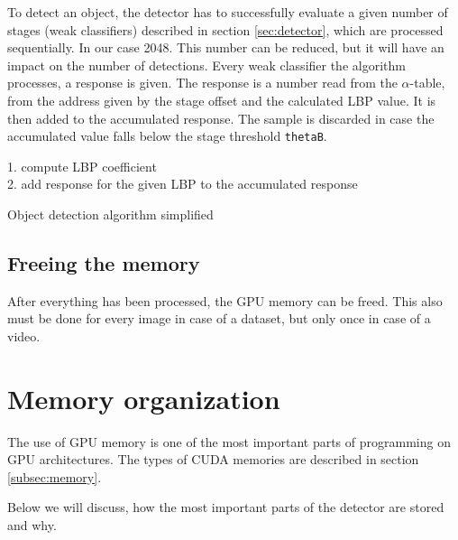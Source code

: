 To detect an object, the detector has to successfully evaluate a given number of stages (weak classifiers) described in section \ref{sec:detector}, which are processed sequentially. In our case 2048. This number can be reduced, but it will have an impact on the number of detections. Every weak classifier the algorithm processes, a response is given. The response is a number read from the $\alpha$-table, from the address given by the stage offset and the calculated LBP value. It is then added to the accumulated response. The sample is discarded in case the accumulated value falls below the stage threshold \verb|thetaB|.

\begin{algorithm} \label{alg:detection}
{
	{
		1. compute LBP coefficient \\
		2. add response for the given LBP to the accumulated response \\
	}
}

\caption{Object detection algorithm simplified}
\end{algorithm}

\subsection{Freeing the memory}\label{subsec:free}

After everything has been processed, the GPU memory can be freed. This also must be done for every image in case of a dataset, but only once in case of a video.

\section{Memory organization} \label{sec:memory-organization}

The use of GPU memory is one of the most important parts of programming on GPU architectures. The types of CUDA memories are described in section \ref{subsec:memory}.

Below we will discuss, how the most important parts of the detector are stored and why.

